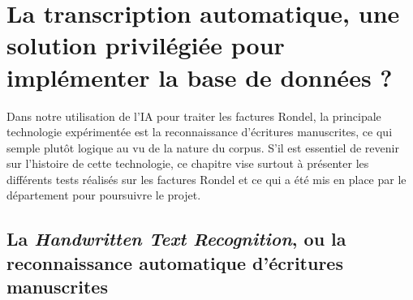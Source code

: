 \chapter{La transcription automatique, une solution privilégiée pour implémenter la base de données ?}

Dans notre utilisation de l'IA pour traiter les factures Rondel, la principale technologie expérimentée est la reconnaissance d'écritures manuscrites, ce qui semple plutôt logique au vu de la nature du corpus. S'il est essentiel de revenir sur l'histoire de cette technologie, ce chapitre vise surtout à présenter les différents tests réalisés sur les factures Rondel et ce qui a été mis en place par le département pour poursuivre le projet. 

\section{La \emph{Handwritten Text Recognition}, ou la reconnaissance automatique d'écritures manuscrites}

